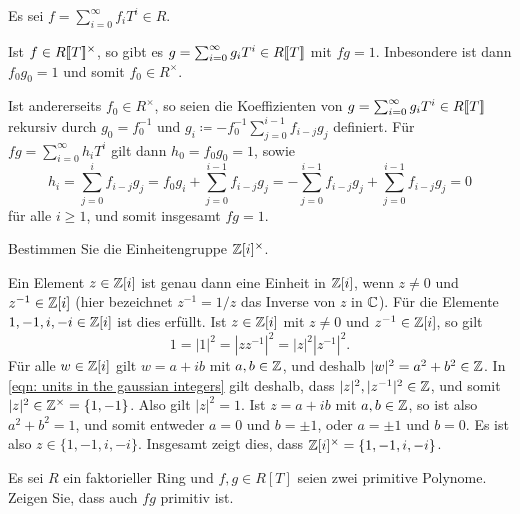 \begin{solution}
  Es sei $f = \sum_{i=0}^\infty f_i T^i \in R$.
  
  Ist $f \in R[\![T]\!]^\times$, so gibt es $g = \sum_{i=0}^\infty g_i T^i \in R[\![T]\!]$ mit $fg = 1$.
  Inbesondere ist dann $f_0 g_0 = 1$ und somit $f_0 \in R^\times$.
  
  Ist andererseits $f_0 \in R^\times$, so seien die Koeffizienten von $g = \sum_{i=0}^\infty g_i T^i \in R[\![T]\!]$ rekursiv durch $g_0 = f_0^{-1}$ und $g_i \coloneqq - f_0^{-1} \sum_{j=0}^{i-1} f_{i-j} g_j$ definiert.
  Für $fg = \sum_{i=0}^\infty h_i T^i$ gilt dann $h_0 = f_0 g_0 = 1$, sowie
  \[
      h_i
    = \sum_{j=0}^i f_{i-j} g_j
    = f_0 g_i + \sum_{j=0}^{i-1} f_{i-j} g_j
    = - \sum_{j=0}^{i-1} f_{i-j} g_j + \sum_{j=0}^{i-1} f_{i-j} g_j
    = 0
  \]
  für alle $i \geq 1$, und somit insgesamt $fg = 1$.
\end{solution}


\begin{question}[subtitle = Einheitengruppe der Gaußschen Zahlen]
  Bestimmen Sie die Einheitengruppe $\mathbb{Z}[i]^\times$.
\end{question}


\begin{solution}
  Ein Element $z \in \mathbb{Z}[i]$ ist genau dann eine Einheit in $\mathbb{Z}[i]$, wenn $z \neq 0$ und $z^{-1} \in \mathbb{Z}[i]$ (hier bezeichnet $z^{-1} = 1/z$ das Inverse von $z$ in $\mathbb{C}$).
  Für die Elemente $1, -1, i, -i \in \mathbb{Z}[i]$ ist dies erfüllt.
  Ist $z \in \mathbb{Z}[i]$ mit $z \neq 0$ und $z^{-1} \in \mathbb{Z}[i]$, so gilt
  \begin{equation}
    \label{eqn: units in the gaussian integers}
      1
    = |1|^2
    = |z z^{-1}|^2
    = |z|^2 |z^{-1}|^2.
  \end{equation}
  Für alle $w \in \mathbb{Z}[i]$ gilt $w = a + ib$ mit $a, b \in \mathbb{Z}$, und deshalb $|w|^2 = a^2 + b^2 \in \mathbb{Z}$.
  In \eqref{eqn: units in the gaussian integers} gilt deshalb, dass $|z|^2, |z^{-1}|^2 \in \mathbb{Z}$, und somit $|z|^2 \in \mathbb{Z}^\times = \{1,-1\}$.
  Also gilt $|z|^2 = 1$.
  Ist $z = a + ib$ mit $a,b \in \mathbb{Z}$, so ist also $a^2 + b^2 = 1$, und somit entweder $a = 0$ und $b = \pm 1$, oder $a = \pm 1$ und $b = 0$.
  Es ist also $z \in \{1, -1, i, -i\}$.
  Insgesamt zeigt dies, dass $\mathbb{Z}[i]^\times = \{1, -1, i, -i\}$.
\end{solution}


\begin{question}[subtitle = Ein Lemma von Gauß]
  Es sei $R$ ein faktorieller Ring und $f, g \in R[T]$ seien zwei primitive Polynome.
  Zeigen Sie, dass auch $fg$ primitiv ist.
\end{question}


